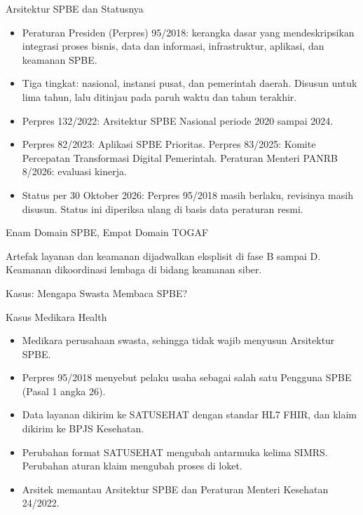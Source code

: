 \documentclass[aspectratio=169, table, 12pt]{beamer}
\begin{document}
\begin{frame}{{\Large Arsitektur SPBE dan Statusnya}}
  \small
  \begin{itemize}
    \item Peraturan Presiden (Perpres) 95/2018: kerangka dasar yang mendeskripsikan integrasi proses
          bisnis, data dan informasi, infrastruktur, aplikasi, dan keamanan SPBE.
    \item Tiga tingkat: nasional, instansi pusat, dan pemerintah daerah. Disusun untuk lima tahun, lalu
          ditinjau pada paruh waktu dan tahun terakhir.
    \item Perpres 132/2022: Arsitektur SPBE Nasional periode 2020 sampai 2024.
    \item Perpres 82/2023: Aplikasi SPBE Prioritas. Perpres 83/2025: Komite Percepatan Transformasi
          Digital Pemerintah. Peraturan Menteri PANRB 8/2026: evaluasi kinerja.
    \item Status per 30 Oktober 2026: Perpres 95/2018 masih berlaku, revisinya masih disusun. Status ini
          diperiksa ulang di basis data peraturan resmi.
  \end{itemize}
\end{frame}

\begin{frame}{{\Large Enam Domain SPBE, Empat Domain TOGAF}}
  \centering

  \vspace{4pt}
  {\small Artefak layanan dan keamanan dijadwalkan eksplisit di fase B sampai D. Keamanan dikoordinasi
  lembaga di bidang keamanan siber.\par}
\end{frame}

\begin{frame}{{\Large Kasus: Mengapa Swasta Membaca SPBE?}}
  \begin{block}{Kasus Medikara Health}
    \small
    \begin{itemize}
      \item Medikara perusahaan swasta, sehingga tidak wajib menyusun Arsitektur SPBE.
      \item Perpres 95/2018 menyebut pelaku usaha sebagai salah satu Pengguna SPBE (Pasal 1 angka 26).
      \item Data layanan dikirim ke SATUSEHAT dengan standar HL7 FHIR, dan klaim dikirim ke BPJS
            Kesehatan.
      \item Perubahan format SATUSEHAT mengubah antarmuka kelima SIMRS. Perubahan aturan klaim mengubah
            proses di loket.
      \item Arsitek memantau Arsitektur SPBE dan Peraturan Menteri Kesehatan 24/2022.
    \end{itemize}
  \end{block}
\end{frame}
\end{document}
